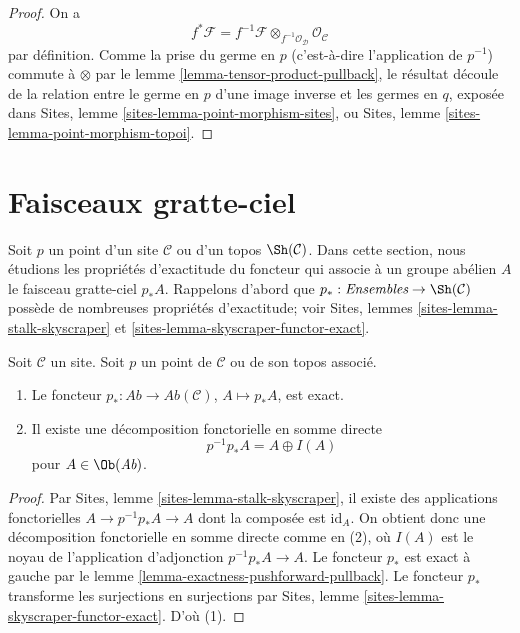 \begin{proof}
On a
$$
f^*\mathcal{F} =
f^{-1}\mathcal{F} \otimes_{f^{-1}\mathcal{O}_\mathcal{D}}
\mathcal{O}_\mathcal{C}
$$
par définition. Comme la prise du germe en $p$ (c'est-à-dire l'application de
$p^{-1}$) commute à $\otimes$ par le
lemme \ref{lemma-tensor-product-pullback}, le résultat découle de la relation
entre le germe en $p$ d'une image inverse et les germes en $q$, exposée dans
Sites, lemme \ref{sites-lemma-point-morphism-sites}, ou
Sites, lemme \ref{sites-lemma-point-morphism-topoi}.
\end{proof}






\section{Faisceaux gratte-ciel}
\label{section-skyscraper}

\noindent
Soit $p$ un point d'un site $\mathcal{C}$ ou d'un topos
$\Sh(\mathcal{C})$. Dans cette section, nous étudions les propriétés
d'exactitude du foncteur qui associe à un groupe abélien $A$ le faisceau
gratte-ciel $p_*A$. Rappelons d'abord que
$p_* : \textit{Ensembles} \to \Sh(\mathcal{C})$ possède de nombreuses propriétés
d'exactitude; voir Sites, lemmes \ref{sites-lemma-stalk-skyscraper} et
\ref{sites-lemma-skyscraper-functor-exact}.

\begin{lemma}
\label{lemma-skyscraper-exact}
Soit $\mathcal{C}$ un site. Soit $p$ un point de $\mathcal{C}$ ou de son
topos associé.
\begin{enumerate}
\item Le foncteur $p_* : \textit{Ab} \to \textit{Ab}(\mathcal{C})$,
$A \mapsto p_*A$, est exact.
\item Il existe une décomposition fonctorielle en somme directe
$$
p^{-1}p_*A = A \oplus I(A)
$$
pour $A \in \Ob(\textit{Ab})$.
\end{enumerate}
\end{lemma}

\begin{proof}
Par Sites, lemme \ref{sites-lemma-stalk-skyscraper}, il existe des
applications fonctorielles $A \to p^{-1}p_*A \to A$ dont la composée est
$\text{id}_A$. On obtient donc une décomposition fonctorielle en somme directe
comme en (2), où $I(A)$ est le noyau de l'application d'adjonction
$p^{-1}p_*A \to A$. Le foncteur $p_*$ est exact à gauche par le
lemme \ref{lemma-exactness-pushforward-pullback}. Le foncteur $p_*$ transforme
les surjections en surjections par Sites,
lemme \ref{sites-lemma-skyscraper-functor-exact}. D'où (1).
\end{proof}

